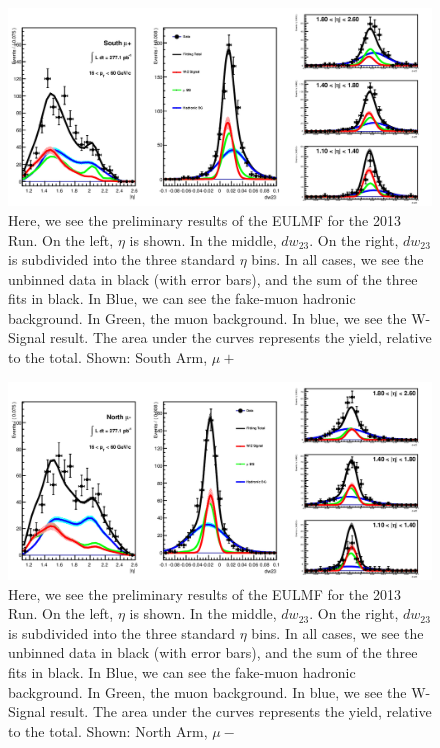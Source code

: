\begin{figure}[ht]
  \centering
  \includegraphics[width=\linewidth]{./figures/prelim_full_maxlikefit_a0q1.jpg}
  \caption{
    Here, we see the preliminary results of the EULMF for the 2013 Run. On the
    left, $\eta$ is shown. In the middle, $dw_{23}$. On the right, $dw_{23}$ is
    subdivided into the three standard $\eta$ bins. In all cases, we see the
    unbinned data in black (with error bars), and the sum of the three fits in
    black. In Blue, we can see the fake-muon hadronic background. In Green, the
    muon background. In blue, we see the W-Signal result. The area under the
    curves represents the yield, relative to the total.  Shown: South Arm,
    $\mu+$~\cite{Seidl2014a}
  }
  \label{fig:maxlikefit_a0q1}
\end{figure}

\begin{figure}[ht]
  \centering
  \includegraphics[width=\linewidth]{./figures/prelim_full_maxlikefit_a1q0.jpg}
  \caption{
    Here, we see the preliminary results of the EULMF for the 2013 Run. On the
    left, $\eta$ is shown. In the middle, $dw_{23}$. On the right, $dw_{23}$ is
    subdivided into the three standard $\eta$ bins. In all cases, we see the
    unbinned data in black (with error bars), and the sum of the three fits in
    black. In Blue, we can see the fake-muon hadronic background. In Green, the
    muon background. In blue, we see the W-Signal result. The area under the
    curves represents the yield, relative to the total.  Shown: North Arm,
    $\mu-$~\cite{Seidl2014a}
  }
  \label{fig:maxlikefit_a1q0}
\end{figure}

